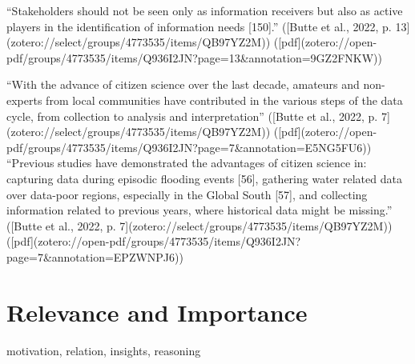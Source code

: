 “Stakeholders should not be seen only as information receivers but also as active players in the identification of information needs [150].” ([Butte et al., 2022, p. 13](zotero://select/groups/4773535/items/QB97YZ2M)) ([pdf](zotero://open-pdf/groups/4773535/items/Q936I2JN?page=13&annotation=9GZ2FNKW))

“With the advance of citizen science over the last decade, amateurs and non-experts from local communities have contributed in the various steps of the data cycle, from collection to analysis and interpretation” ([Butte et al., 2022, p. 7](zotero://select/groups/4773535/items/QB97YZ2M)) ([pdf](zotero://open-pdf/groups/4773535/items/Q936I2JN?page=7&annotation=E5NG5FU6))
“Previous studies have demonstrated the advantages of citizen science in: capturing data during episodic flooding events [56], gathering water related data over data-poor regions, especially in the Global South [57], and collecting information related to previous years, where historical data might be missing.” ([Butte et al., 2022, p. 7](zotero://select/groups/4773535/items/QB97YZ2M)) ([pdf](zotero://open-pdf/groups/4773535/items/Q936I2JN?page=7&annotation=EPZWNPJ6))







\section{Relevance and Importance}
motivation, relation, insights, reasoning



